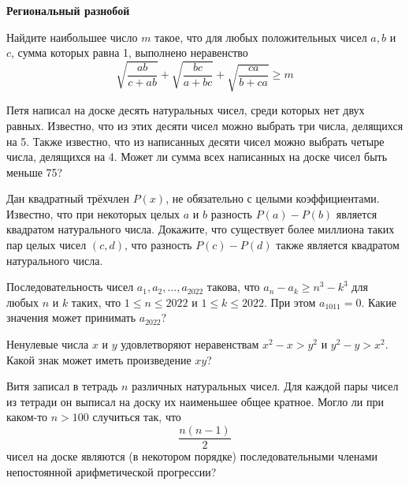 \documentclass{article}
\begin{document}
    \large

    \begin{center}
        \textbf{Региональный разнобой}
    \end{center}


    \begin{enumerate_boxed}

        \item Найдите наибольшее число $m$ такое, что для любых положительных чисел $a, b$ и $c$, сумма которых равна 1, выполнено неравенство
        \[\sqrt{\frac{ab}{c + ab}} + \sqrt{\frac{bc}{a + bc}} + \sqrt{\frac{ca}{b + ca}} \geqslant m\]

        \item Петя написал на доске десять натуральных чисел, среди которых нет двух равных.
        Известно, что из этих десяти чисел можно выбрать три числа, делящихся на 5.
        Также известно, что из написанных десяти чисел можно выбрать четыре числа, делящихся на 4.
        Может ли сумма всех написанных на доске чисел быть меньше 75?

        \item  Дан квадратный трёхчлен $P(x)$, не обязательно с целыми коэффициентами.
        Известно, что при некоторых целых $a$ и $b$ разность $P(a) - P(b)$ является квадратом натурального числа.
        Докажите, что существует более миллиона таких пар целых чисел $(c, d)$, что разность $P(c) - P(d)$ также является квадратом натурального числа.

        \item Последовательность чисел $a_1, a_2, \dotsc , a_{2022}$ такова, что $a_n - a_k \geqslant n^3 - k^3$ для любых $n$ и $k$ таких, что $1 \leqslant n \leqslant 2022$ и $1 \leqslant k \leqslant 2022$.
        При этом $a_{1011} = 0$.
        Какие значения может принимать $a_{2022}$?

        \item  Ненулевые числа $x$ и $y$ удовлетворяют неравенствам $x^2 - x > y^2$ и $y^2 - y > x^2$.
        Какой знак может иметь произведение $xy$?

        \item Витя записал в тетрадь $n$ различных натуральных чисел.
        Для каждой пары чисел из тетради он выписал на доску их наименьшее общее кратное.
        Могло ли при каком-то $n > 100$ случиться так, что \[\frac{n(n - 1)}{2}\] чисел на доске являются (в некотором порядке) последовательными членами непостоянной арифметической прогрессии?


\end{enumerate_boxed}
\end{document}
